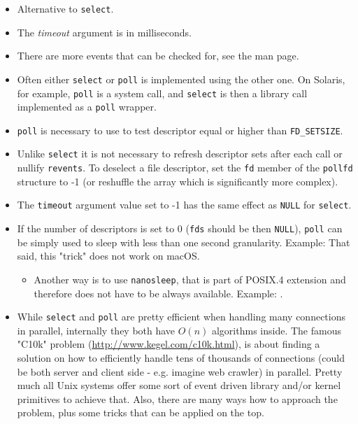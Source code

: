 \begin{itemize}
\item Alternative to \texttt{select}.
\item The \emph{timeout} argument is in milliseconds.
\item There are more events that can be checked for, see the man page.
\item Often either \texttt{select} or \texttt{poll} is implemented using the
other one.  On Solaris, for example, \texttt{poll} is a system call, and
\texttt{select} is then a library call implemented as a \texttt{poll} wrapper.
\item \texttt{poll} is necessary to use to test descriptor equal or higher than
\texttt{FD\_SETSIZE}.
\item Unlike \texttt{select} it is not necessary to refresh descriptor sets
after each call or nullify \texttt{revents}. To deselect a file descriptor,
set the \texttt{fd} member of the \texttt{pollfd} structure to -1
(or reshuffle the array which is significantly more complex).
\item The \texttt{timeout} argument value set to -1 has the same effect
as \texttt{NULL} for \texttt{select}.
\item If the number of descriptors is set to 0 (\texttt{fds} should be then
\texttt{NULL}), \texttt{poll} can be simply used to sleep with less than one
second granularity. Example:  
That said, this "trick" does not work on macOS.
\begin{itemize}
\item Another way is to use \texttt{nanosleep}, that is part of POSIX.4
extension and therefore does not have to be always available.
Example: .
\end{itemize}
\item While \texttt{select} and \texttt{poll} are pretty efficient when handling
many connections in parallel, internally they both have $O(n)$ algorithms
inside. The famous "C10k" problem (\url{http://www.kegel.com/c10k.html}),
is about finding a solution on how to efficiently handle tens of thousands of
connections (could be both server and client side - e.g. imagine web crawler) in
parallel. Pretty much all Unix systems offer some sort of event driven library
and/or kernel primitives to achieve that. Also, there are many ways how to
approach the problem, plus some tricks that can be applied on the top.
\end{itemize}

\endinput
